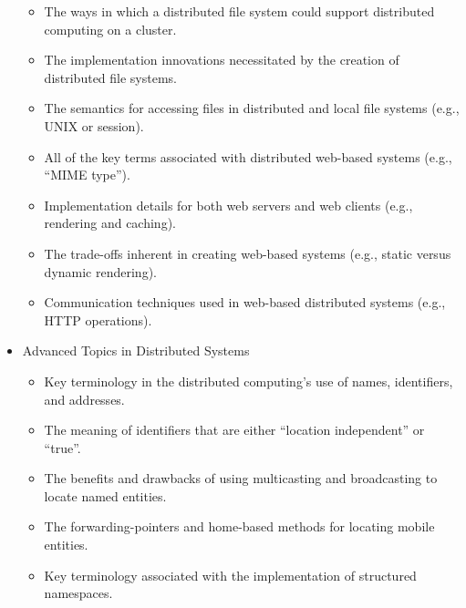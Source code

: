 \begin{itemize}[leftmargin=0.25in]
\begin{itemize}[leftmargin=0in]
      \item The ways in which a distributed file system could support distributed computing on a cluster.

      \item The implementation innovations necessitated by the creation of distributed file systems.

      \item The semantics for accessing files in distributed and local file systems (e.g., UNIX or session).

      \item All of the key terms associated with distributed web-based systems (e.g., ``MIME type'').

      \item Implementation details for both web servers and web clients (e.g., rendering and caching).

      \item The trade-offs inherent in creating web-based systems (e.g., static versus dynamic rendering).

      \item Communication techniques used in web-based distributed systems (e.g., HTTP operations).


    \end{itemize}

  \item Advanced Topics in Distributed Systems

    \vspace*{-.05in}
    \begin{itemize}[leftmargin=0in]

      \itemsep 0in

      \item Key terminology in the distributed computing's use of names, identifiers, and addresses.

      \item The meaning of identifiers that are either ``location independent'' or ``true''.

      \item The benefits and drawbacks of using multicasting and broadcasting to locate named entities.

      \item The forwarding-pointers and home-based methods for locating mobile entities.

      \item Key terminology associated with the implementation of structured namespaces.


\end{itemize}
\end{itemize}

